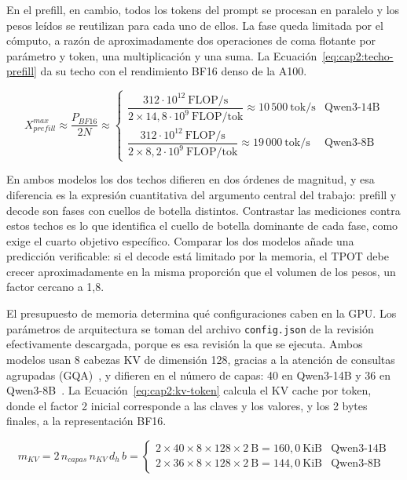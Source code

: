 En el prefill, en cambio, todos los tokens del prompt se procesan en paralelo y los pesos leídos se reutilizan para cada uno de ellos. La fase queda limitada por el cómputo, a razón de aproximadamente dos operaciones de coma flotante por parámetro y token, una multiplicación y una suma. La Ecuación~\ref{eq:cap2:techo-prefill} da su techo con el rendimiento BF16 denso de la A100.

\begin{equation}
\label{eq:cap2:techo-prefill}
X_{prefill}^{max} \approx \frac{P_{BF16}}{2N} \approx
\begin{cases}
\dfrac{312 \cdot 10^{12}~\mathrm{FLOP/s}}{2 \times 14{,}8 \cdot 10^{9}~\mathrm{FLOP/tok}} \approx 10\,500~\mathrm{tok/s} & \text{Qwen3-14B} \\[10pt]
\dfrac{312 \cdot 10^{12}~\mathrm{FLOP/s}}{2 \times 8{,}2 \cdot 10^{9}~\mathrm{FLOP/tok}} \approx 19\,000~\mathrm{tok/s} & \text{Qwen3-8B}
\end{cases}
\end{equation}

En ambos modelos los dos techos difieren en dos órdenes de magnitud, y esa diferencia es la expresión cuantitativa del argumento central del trabajo: prefill y decode son fases con cuellos de botella distintos. Contrastar las mediciones contra estos techos es lo que identifica el cuello de botella dominante de cada fase, como exige el cuarto objetivo específico. Comparar los dos modelos añade una predicción verificable: si el decode está limitado por la memoria, el TPOT debe crecer aproximadamente en la misma proporción que el volumen de los pesos, un factor cercano a 1,8.

El presupuesto de memoria determina qué configuraciones caben en la GPU. Los parámetros de arquitectura se toman del archivo \texttt{config.json} de la revisión efectivamente descargada, porque es esa revisión la que se ejecuta. Ambos modelos usan 8 cabezas KV de dimensión 128, gracias a la atención de consultas agrupadas (GQA)~\cite{ainslie2023gqa}, y difieren en el número de capas: 40 en Qwen3-14B y 36 en Qwen3-8B~\cite{qwen2025qwen3}. La Ecuación~\ref{eq:cap2:kv-token} calcula el KV cache por token, donde el factor 2 inicial corresponde a las claves y los valores, y los 2 bytes finales, a la representación BF16.

\begin{equation}
\label{eq:cap2:kv-token}
m_{KV} = 2\, n_{capas}\, n_{KV}\, d_{h}\, b =
\begin{cases}
2 \times 40 \times 8 \times 128 \times 2~\mathrm{B} = 160{,}0~\mathrm{KiB} & \text{Qwen3-14B} \\
2 \times 36 \times 8 \times 128 \times 2~\mathrm{B} = 144{,}0~\mathrm{KiB} & \text{Qwen3-8B}
\end{cases}
\end{equation}

